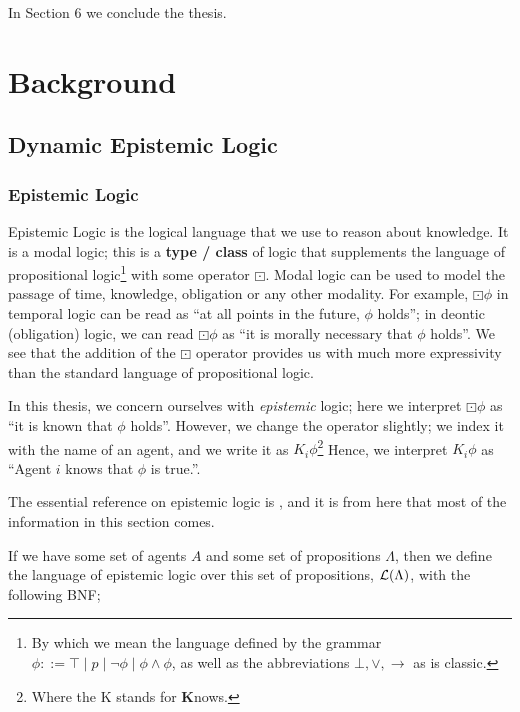 \documentclass[12pt, a4paper]{article}
\begin{document}
In Section 6 we conclude the thesis. 

\newpage

\section{Background}

\subsection{Dynamic Epistemic Logic}
\label{subsec:DEL}

\subsubsection{Epistemic Logic}

Epistemic Logic is the logical language that we use to reason about knowledge.
It is a modal logic; this is a \textbf{type / class} of logic that supplements
the language of propositional logic\footnote{By which we mean the language
  defined by the grammar $\phi ::= \top \mid p \mid \neg \phi \mid \phi \land
  \phi$, as well as the abbreviations $\bot, \lor, \rightarrow$ as is classic.}
with some operator $\boxdot$. Modal logic can be used to model the passage of
time, knowledge, obligation or any other modality. For example, $\boxdot \phi$
in temporal logic can be read as ``at all points in the future, $\phi$ holds'';
in deontic (obligation) logic, we can read $\boxdot \phi$ as ``it is morally
necessary that $\phi$ holds''. We see that the addition of the $\boxdot$
operator provides us with much more expressivity than the standard language of
propositional logic.

In this thesis, we concern ourselves with \textit{epistemic} logic; here we
interpret $\boxdot \phi$ as ``it is known that $\phi$ holds''. However, we
change the operator slightly; we index it with the name of an agent, and we
write it as $K_i \phi$\footnote{Where the K stands for \textbf{K}nows.} Hence,
we interpret $K_i \phi$ as ``Agent $i$ knows that $\phi$ is true.''.

The essential reference on epistemic logic is \cite{ReasoningAboutKnowledge},
and it is from here that most of the information in this section comes.
  
If we have some set of agents $A$ and some set of propositions $\Lambda$, then
we define the language of epistemic logic over this set of propositions,
$\mathcal{L}(\Lambda)$, with the following BNF;
\end{document}
